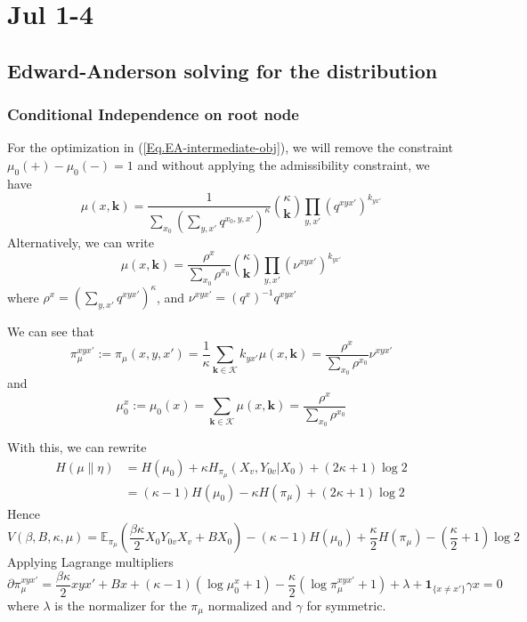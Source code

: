 \documentclass[12pt]{article}
\numberwithin{equation}{section}
\begin{document}
\newpage

\section{Jul 1-4}

\subsection{Edward-Anderson solving for the distribution}

\subsubsection{Conditional Independence on root node}
For the optimization in (\ref{Eq.EA-intermediate-obj}), we will remove the constraint $\mu_0(+) - \mu_0(-)=1$ and without applying the
admissibility constraint, we have
\begin{equation}
    \mu(x, \mathbf{k}) = \frac{1}{{\sum_{x_0}\left(\sum_{y, x'} q^{x_0, y, x'}\right)^\kappa}}{\kappa \choose \mathbf{k}}\prod_{y, x'}(q^{xyx'})^{k_{yx'}}
\end{equation}
Alternatively, we can write
\begin{equation}
    \mu(x, \mathbf{k}) = \frac{\rho^x}{{\sum_{x_0} \rho^{x_0}}}{\kappa \choose \mathbf{k}}\prod_{y, x'}\left(\nu^{xyx'}\right)^{k_{yx'}}
\end{equation}
where $\rho^x = \left(\sum_{y, x'} q^{xyx'}\right)^\kappa$, and $\nu^{xyx'} = (q^x)^{-1}q^{xyx'}$

We can see that
\begin{equation}
    \pi_\mu^{xyx'}:=\pi_\mu(x, y, x') = \frac1\kappa\sum_{\mathbf{k}\in\mathcal{K}}k_{yx'}\mu(x, \mathbf{k}) = \frac{\rho^x}{{\sum_{x_0} \rho^{x_0}}} \nu^{xyx'}
\end{equation}
and
\begin{equation}
    \mu_0^x:=\mu_0(x) = \sum_{\mathbf{k}\in\mathcal{K}} \mu(x, \mathbf{k}) = \frac{\rho^x}{{\sum_{x_0} \rho^{x_0}}}
\end{equation}

With this, we can rewrite
\begin{align}
    H(\mu \| \eta) & = H(\mu_0) + \kappa H_{\pi_\mu}(X_v, Y_{0v} | X_0) + (2\kappa + 1) \log 2 \\
                   & = (\kappa-1)H(\mu_0) - \kappa H(\pi_\mu) + (2\kappa + 1) \log 2
\end{align}
Hence
\begin{equation}
    V(\beta, B, \kappa, \mu) = \mathbb{E}_{\pi_\mu}\left(\frac{\beta\kappa}{2}X_0Y_{0v}X_v + BX_0\right) - (\kappa - 1) H(\mu_0) + \frac\kappa2 H(\pi_\mu) - \left(\frac\kappa2 + 1\right)\log 2
\end{equation}
Applying Lagrange multipliers
\begin{equation}
    \partial \pi_\mu^{xyx'} = \frac{\beta\kappa}{2}xyx' + Bx + (\kappa - 1)\left(\log\mu_0^x + 1\right) - \frac\kappa2\left(\log\pi_\mu^{xyx'} + 1\right) + \lambda + \mathbf{1}_{\{x\neq x'\}} \gamma x = 0
    \label{Eq.EA-LM-pi-mu}
\end{equation}
where $\lambda$ is the normalizer for the $\pi_\mu$ normalized and $\gamma$ for symmetric.
\end{document}
